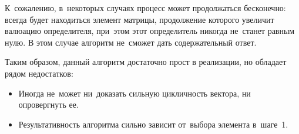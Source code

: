 К~сожалению, в~некоторых случаях процесс может продолжаться бесконечно:
всегда будет находиться элемент матрицы, продолжение которого увеличит валюацию определителя,
при~этом этот определитель никогда не~станет равным нулю.
В этом случае алгоритм не~сможет дать содержательный ответ.

Таким образом, данный алгоритм достаточно прост в реализации, но обладает рядом недостатков:
\begin{itemize}
    \item
        Иногда не~может ни~доказать сильную цикличность вектора, ни опровергнуть ее.
    \item
        Результативность алгоритма сильно зависит от~выбора элемента в~шаге~1.
\end{itemize}
